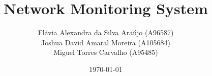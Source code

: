 



\title{\LARGE{Network Monitoring System}}

\author{
    Flávia Alexandra da Silva Araújo (A96587)\\ \quad
    Joshua David Amaral Moreira (A105684)\\ \quad
    Miguel Torres Carvalho (A95485)\\ \quad
}

\date{\today}

\newcommand{\Course}{Licenciatura em Engenharia Informática}

\newcommand{\Department}{Escola de Engenharia}

\newcommand{\UniName}{Universidade do Minho}

\newcommand{\UniPic}{\texttt{[image: img/eeum.png]}}

\newcommand{\University}{
    \begin{flushleft}
        \UniPic
    \end{flushleft}
    \textcolor{gray}{\small\textbf{\textsf{\UniName}}}\par
    \textcolor{gray!80!white}{\small{\textsf{\Department}}}\par
    \textcolor{gray!70!white}{\small{\textsf{\Course}}}
}

\newcommand{\UC}{
    \begin{flushleft}
        \par\textcolor{titlepagecolor}{\Large\textbf{\textsf{Comunicações Por Computador}}}
    \end{flushleft}
}

